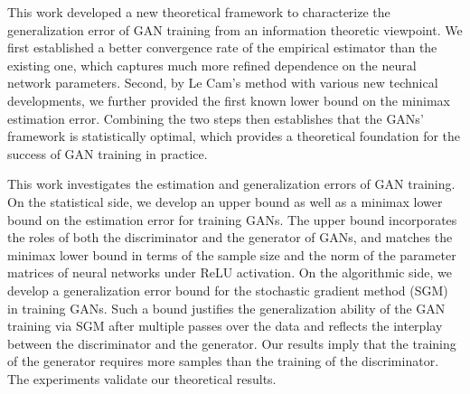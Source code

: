 \documentclass{osudissert96}
\begin{document}
 \vspace{0.2cm}
This work developed a new theoretical framework to characterize the generalization error of GAN training from an information theoretic viewpoint. 
We first established a better convergence rate of the empirical estimator than the existing one, which captures much more refined dependence on the neural network parameters. Second, by Le Cam's method with various new technical developments, we further provided the first known lower bound on the minimax estimation error.
Combining the two steps then establishes that the GANs' framework is statistically optimal, which provides a theoretical foundation for the success of GAN training in practice. 

 \vspace{0.2cm}
This work investigates the estimation and generalization errors of GAN training. On the statistical side, we develop an upper bound as well as a minimax lower bound on the estimation error  for training GANs. The upper  bound incorporates the roles of both the discriminator and the generator of GANs, and matches the minimax lower bound in terms of the sample size and the norm of the parameter matrices of neural networks under ReLU activation. On the algorithmic side,   
we develop a generalization error bound for the stochastic gradient method (SGM) in training GANs. Such a bound justifies the generalization ability of the GAN training via SGM after multiple passes over the data and reflects the interplay between the discriminator and the generator. 
Our results imply that the training of the generator requires more samples than the training of the discriminator. The experiments validate our theoretical results.
\end{document}
